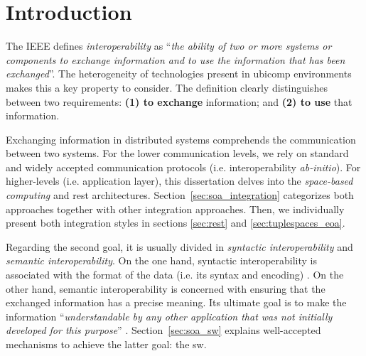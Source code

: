 \section{Introduction}
\label{sec:soa_intro}



The IEEE \citep{_ieee_1990} defines \emph{interoperability} as ``\emph{the ability of two or more systems or components to exchange information and to use the information that has been exchanged}''.
The heterogeneity of technologies present in \ac{ubicomp} environments makes this a key property to consider.
The definition clearly distinguishes between two requirements: %
\textbf{(1) to exchange} information; and
\textbf{(2) to use} that information. %


Exchanging information in distributed systems comprehends the communication between two systems.
For the lower communication levels, we rely on standard and widely accepted communication protocols (i.e. interoperability \emph{ab-initio}). %
For higher-levels (i.e. application layer), this dissertation delves into the \emph{space-based computing} and \ac{rest} architectures.
Section~\ref{sec:soa_integration} categorizes both approaches together with other integration approaches.
Then, we individually present both integration styles in sections \ref{sec:rest} and \ref{sec:tuplespaces_eoa}.


Regarding the second goal, it is usually divided in \emph{syntactic interoperability} and \emph{semantic interoperability}.
On the one hand, syntactic interoperability is associated with the format of the data (i.e. its syntax and encoding) \citep{van_der_veer_achieving_2006}. %
On the other hand, semantic interoperability is concerned with ensuring that the exchanged information has a precise meaning.
Its ultimate goal is to make the information ``\emph{understandable by any other application that was not initially developed for this purpose}'' \citep{_european_2004}.
Section~\ref{sec:soa_sw} explains well-accepted mechanisms to achieve the latter goal: the \acl{sw}. %




